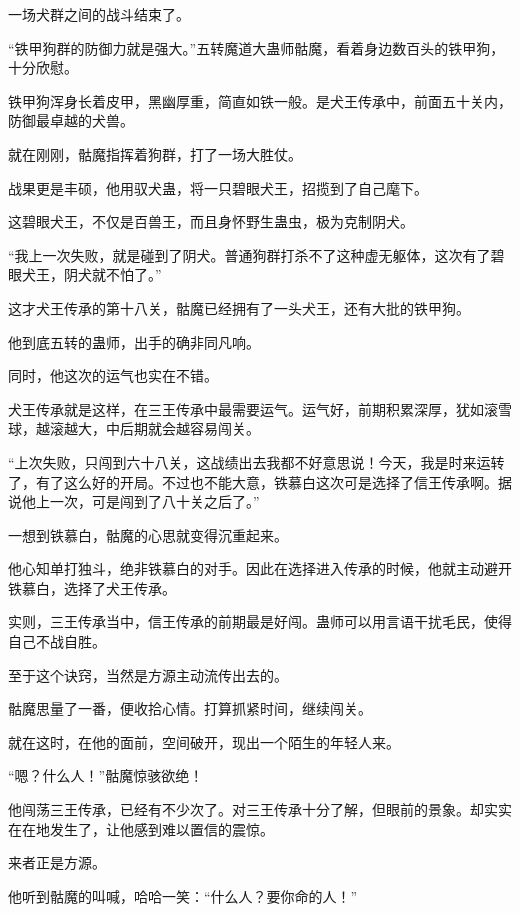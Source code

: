 
\begin{this_body}

一场犬群之间的战斗结束了。

“铁甲狗群的防御力就是强大。”五转魔道大蛊师骷魔，看着身边数百头的铁甲狗，十分欣慰。

铁甲狗浑身长着皮甲，黑幽厚重，简直如铁一般。是犬王传承中，前面五十关内，防御最卓越的犬兽。

就在刚刚，骷魔指挥着狗群，打了一场大胜仗。

战果更是丰硕，他用驭犬蛊，将一只碧眼犬王，招揽到了自己麾下。

这碧眼犬王，不仅是百兽王，而且身怀野生蛊虫，极为克制阴犬。

“我上一次失败，就是碰到了阴犬。普通狗群打杀不了这种虚无躯体，这次有了碧眼犬王，阴犬就不怕了。”

这才犬王传承的第十八关，骷魔已经拥有了一头犬王，还有大批的铁甲狗。

他到底五转的蛊师，出手的确非同凡响。

同时，他这次的运气也实在不错。

犬王传承就是这样，在三王传承中最需要运气。运气好，前期积累深厚，犹如滚雪球，越滚越大，中后期就会越容易闯关。

“上次失败，只闯到六十八关，这战绩出去我都不好意思说！今天，我是时来运转了，有了这么好的开局。不过也不能大意，铁慕白这次可是选择了信王传承啊。据说他上一次，可是闯到了八十关之后了。”

一想到铁慕白，骷魔的心思就变得沉重起来。

他心知单打独斗，绝非铁慕白的对手。因此在选择进入传承的时候，他就主动避开铁慕白，选择了犬王传承。

实则，三王传承当中，信王传承的前期最是好闯。蛊师可以用言语干扰毛民，使得自己不战自胜。

至于这个诀窍，当然是方源主动流传出去的。

骷魔思量了一番，便收拾心情。打算抓紧时间，继续闯关。

就在这时，在他的面前，空间破开，现出一个陌生的年轻人来。

“嗯？什么人！”骷魔惊骇欲绝！

他闯荡三王传承，已经有不少次了。对三王传承十分了解，但眼前的景象。却实实在在地发生了，让他感到难以置信的震惊。

来者正是方源。

他听到骷魔的叫喊，哈哈一笑：“什么人？要你命的人！”


\end{this_body}
